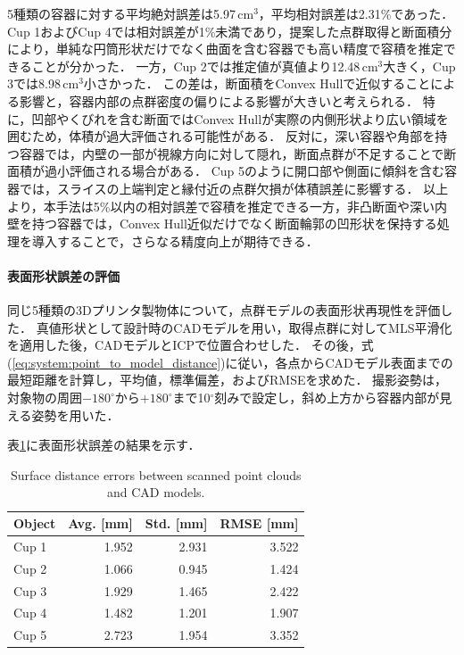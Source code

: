5種類の容器に対する平均絶対誤差は5.97\,$\mathrm{cm}^3$，平均相対誤差は2.31\%であった．
Cup 1およびCup 4では相対誤差が1\%未満であり，提案した点群取得と断面積分により，単純な円筒形状だけでなく曲面を含む容器でも高い精度で容積を推定できることが分かった．
一方，Cup 2では推定値が真値より12.48\,$\mathrm{cm}^3$大きく，Cup 3では8.98\,$\mathrm{cm}^3$小さかった．
この差は，断面積をConvex Hullで近似することによる影響と，容器内部の点群密度の偏りによる影響が大きいと考えられる．
特に，凹部やくびれを含む断面ではConvex Hullが実際の内側形状より広い領域を囲むため，体積が過大評価される可能性がある．
反対に，深い容器や角部を持つ容器では，内壁の一部が視線方向に対して隠れ，断面点群が不足することで断面積が過小評価される場合がある．
Cup 5のように開口部や側面に傾斜を含む容器では，スライスの上端判定と縁付近の点群欠損が体積誤差に影響する．
以上より，本手法は5\%以内の相対誤差で容積を推定できる一方，非凸断面や深い内壁を持つ容器では，Convex Hull近似だけでなく断面輪郭の凹形状を保持する処理を導入することで，さらなる精度向上が期待できる．

\paragraph{表面形状誤差の評価}

同じ5種類の3Dプリンタ製物体について，点群モデルの表面形状再現性を評価した．
真値形状として設計時のCADモデルを用い，取得点群に対してMLS平滑化を適用した後，CADモデルとICPで位置合わせした．
その後，式(\ref{eq:system:point_to_model_distance})に従い，各点からCADモデル表面までの最短距離を計算し，平均値，標準偏差，およびRMSEを求めた．
撮影姿勢は，対象物の周囲$-180^{\circ}$から$+180^{\circ}$まで10$^{\circ}$刻みで設定し，斜め上方から容器内部が見える姿勢を用いた．

表\ref{tab:system:container-surface-error}に表面形状誤差の結果を示す．

\begin{table}[t]
  \centering
  \caption{Surface distance errors between scanned point clouds and CAD models.}
  \label{tab:system:container-surface-error}
  \small
  \begin{tabular}{lrrr}
    \toprule
    \textbf{Object} & \textbf{Avg. [mm]} & \textbf{Std. [mm]} & \textbf{RMSE [mm]} \\
    \midrule
    Cup 1 & 1.952 & 2.931 & 3.522 \\
    Cup 2   & 1.066 & 0.945 & 1.424 \\
    Cup 3 & 1.929 & 1.465 & 2.422 \\
    Cup 4 & 1.482 & 1.201 & 1.907 \\
    Cup 5 & 2.723 & 1.954 & 3.352 \\
    \bottomrule
  \end{tabular}
\end{table}


